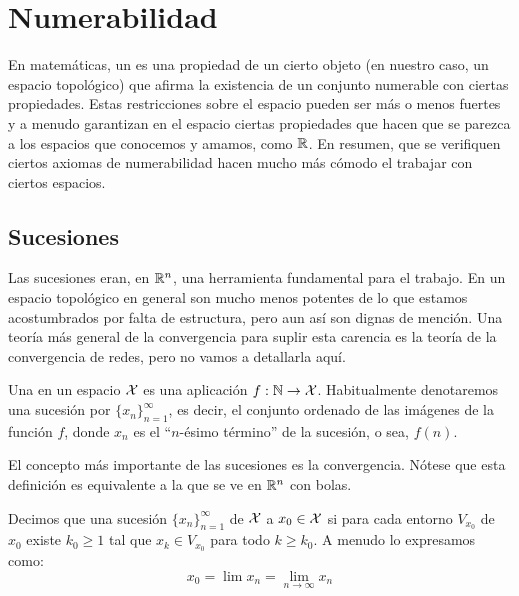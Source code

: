 \chapter{Numerabilidad}
\label{num}

En matemáticas, un  es una propiedad de un cierto objeto (en nuestro caso, un espacio topológico) que afirma la existencia de un conjunto numerable con ciertas propiedades. Estas restricciones sobre el espacio pueden ser más o menos fuertes y a menudo garantizan en el espacio ciertas propiedades que hacen que se parezca a los espacios que conocemos y amamos, como $\mathbb{R}$. En resumen, que se verifiquen ciertos axiomas de numerabilidad hacen mucho más cómodo el trabajar con ciertos espacios.

\section{Sucesiones}

Las sucesiones eran, en $\mathbb{R}^n$, una herramienta fundamental para el trabajo. En un espacio topológico en general son mucho menos potentes de lo que estamos acostumbrados por falta de estructura, pero aun así son dignas de mención. Una teoría más general de la convergencia para suplir esta carencia es la teoría de la convergencia de redes, pero no vamos a detallarla aquí. 

\begin{defi}[Sucesión]
	Una  en un espacio $\mathcal{X}$ es una aplicación $f:\mathbb{N}\to \mathcal{X}$. Habitualmente denotaremos una sucesión por $\{x_n\}_{n=1}^{\infty}$, es decir, el conjunto ordenado de las imágenes de la función $f$, donde $x_n$ es el ``$n$-ésimo término'' de la sucesión, o sea, $f(n)$. 
\end{defi}

El concepto más importante de las sucesiones es la convergencia. Nótese que esta definición es equivalente a la que se ve en $\mathbb{R}^n$ con bolas.

\begin{defi}[Convergencia]
	\label{num_defi_convergencia}
	Decimos que una sucesión $\{x_n\}_{n=1}^\infty$ de $\mathcal{X}$  a $x_0\in \mathcal{X}$ si para cada entorno $V_{x_0}$ de $x_0$ existe $k_0\geq 1$ tal que $x_k\in V_{x_0}$ para todo $k\geq k_0$. A menudo lo expresamos como:
	\[x_0=\lim x_n = \lim_{n\to\infty} x_n\]
\end{defi}

